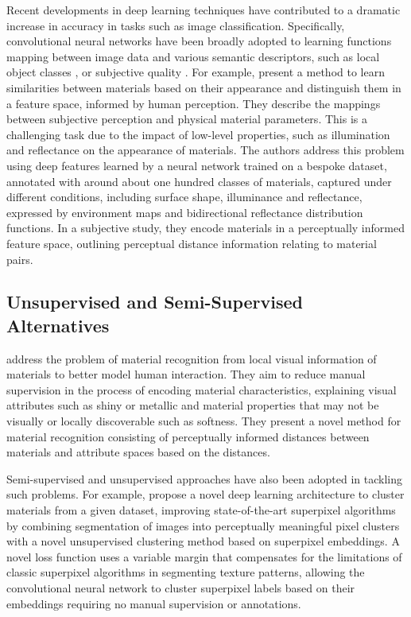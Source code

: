 Recent developments in deep learning techniques have contributed to a dramatic increase in accuracy in tasks such as image classification. Specifically, convolutional neural networks have been broadly adopted to learning functions mapping between image data and various semantic descriptors, such as local object classes \citep{long2015fully}, or subjective quality \citep{bosse2017deep}. For example, \cite{lagunas2019similarity} present a method to learn similarities between materials based on their appearance and distinguish them in a feature space, informed by human perception. They describe the mappings between subjective perception and physical material parameters. This is a challenging task due to the impact of low-level properties, such as illumination and reflectance on the appearance of materials. The authors address this problem using deep features learned by a neural network trained on a bespoke dataset, annotated with around about one hundred classes of materials, captured under different conditions, including surface shape, illuminance and reflectance, expressed by environment maps and bidirectional reflectance distribution functions. In a subjective study, they encode materials in a perceptually informed feature space, outlining perceptual distance information relating to material pairs.\par

\subsection{Unsupervised and Semi-Supervised Alternatives}
\cite{schwartz2019recognizing} address the problem of material recognition from local visual information of materials to better model human interaction. They aim to reduce manual supervision in the process of encoding material characteristics, explaining visual attributes such as shiny or metallic and material properties that may not be visually or locally discoverable such as softness. They present a novel method for material recognition consisting of perceptually informed distances between materials and attribute spaces based on the distances.

Semi-supervised and unsupervised approaches have also been adopted in tackling such problems. For example, \cite{gaur2019superpixel} propose a novel deep learning architecture to cluster materials from a given dataset, improving state-of-the-art superpixel algorithms by combining segmentation of images into perceptually meaningful pixel clusters with a novel unsupervised clustering method based on superpixel embeddings. A novel loss function uses a variable margin that compensates for the limitations of classic superpixel algorithms in segmenting texture patterns, allowing the convolutional neural network to cluster superpixel labels based on their embeddings requiring no manual supervision or annotations.\par%

